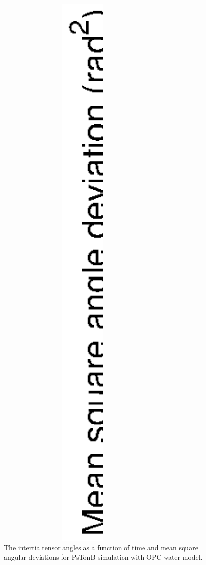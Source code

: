 \documentclass[pre,aps,floatfix,authordate1-4,twocolumn]{revtex4-1}
\begin{document}
\begin{figure}[!h]
  \includegraphics[width=8.5cm]{../Figs/RMASDplot.eps}%
  \caption{The intertia tensor angles as a function of time and mean square angular
    deviations for PsTonB simulation with OPC water model.
    \label{RMASDplot}}%
\end{figure}
\end{document}
